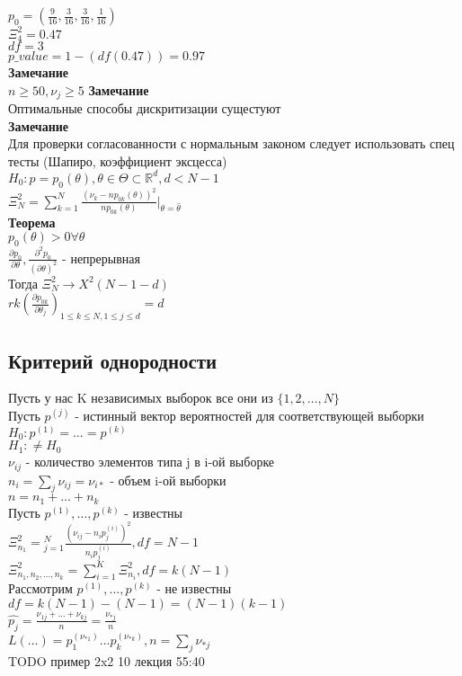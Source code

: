 \documentclass{article}
\newcommand\0{\mathbb{0}}
\newcommand\1{\mathbb{1}}
\newcommand{\pat}{\partial}
\begin{document}
$p_0 = (\frac{9}{16}, \frac{3}{16}, \frac{3}{16}, \frac{1}{16})$\\
$\Xi_4^2 = 0.47$\\
$df = 3$\\
$p\_value = 1 - (df(0.47)) = 0.97$\\
\textbf{Замечание}\\
$n \geq 50, \nu_j \geq 5$
\textbf{Замечание}\\
Оптимальные способы дискритизации сущестуют\\
\textbf{Замечание}\\
Для проверки согласованности с нормальным законом следует использовать спец тесты (Шапиро, коэффициент эксцесса)\\
$H_0: p = p_0(\theta), \theta \in \Theta \subset \mathbb{R}^d, d < N - 1$\\
$\Xi_N^2 = \displaystyle\sum_{k = 1}^N \frac{(\nu_k - np_{0k}(\theta))^2}{np_{0k}(\theta)}|_{\theta = \widehat{\theta}}$\\
\textbf{Теорема}\\
$p_0(\theta) > 0 \forall \theta$\\
$\frac{\pat p_0}{\pat \theta}, \frac{\pat^2 p_0}{(\pat \theta)^2}$ - непрерывная\\
Тогда $\Xi_N^2 \to X^2(N - 1 - d)$\\
$rk(\frac{\pat p_{0k}}{\pat \theta_j})_{1 \leq k \leq N, 1 \leq j \leq d} = d$\\
\subsection{Критерий однородности}
Пусть у нас K независимых выборок все они из $\{1, 2, \dots, N\}$\\
Пусть $p^{(j)}$ - истинный вектор вероятностей для соответствующей выборки\\
$H_0: p^{(1)} = \dots = p^{(k)}$\\
$H_1: \neq H_0$\\
$\nu_{ij}$ - количество элементов типа j в i-ой выборке\\
$n_i = \displaystyle\sum_j \nu_{ij} = \nu_{i*}$ - объем i-ой выборки\\
$n = n_1 + \dots + n_k$\\
Пусть $p^{(1)}, \dots, p^{(k)}$ - известны\\
$\Xi_{n_1}^2 = \displaystyle_{j = 1}^N \frac{(\nu_{ij} - n_i p_j^{(i)})^2}{n_i p_j^(i)}, df = N - 1$\\
$\Xi^2_{n_1, n_2, \dots, n_k} = \displaystyle\sum_{i = 1}^K \Xi_{n_i}^2, df = k(N - 1)$\\
Рассмотрим $p^{(1)}, \dots, p^{(k)}$ - не известны\\
$df = k(N - 1) - (N - 1) = (N - 1)(k - 1)$\\
$\widehat{p_{j}} = \frac{\nu_{1j} + \dots + \nu_{kj}}{n} = \frac{\nu_{*j}}{n}$\\
$L(\dots) = p_1^{(\nu_{*1})} \dots p_k^{(\nu_{*k})}, n = \displaystyle\sum_j \nu_{*j}$\\
TODO пример 2x2 10 лекция 55:40\\
\end{document}
